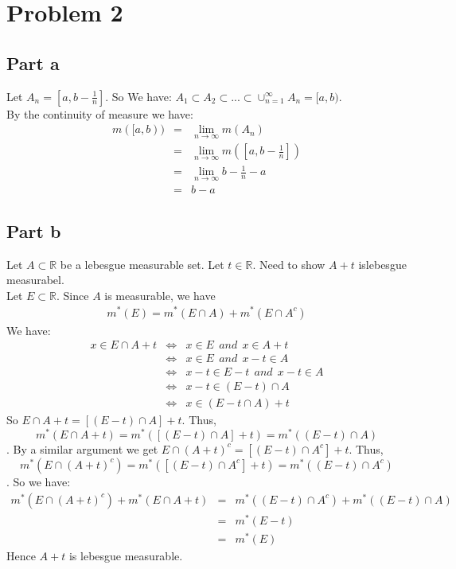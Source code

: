 \documentclass[12pt]{article}
\begin{document}
\clearpage
\section*{Problem 2}
\subsection*{Part a}
Let $A_n=[a,b-\frac{1}{n}]$. So We have:
$A_1 \subset A_2 \subset ... \subset \cup_{n=1}^{\infty}
A_n=[a,b)$. \\
By the continuity of measure we have:
\begin{eqnarray*}
m([a,b)) &=& \lim_{n \rightarrow \infty} m(A_n)
\\ &=&
\lim_{n \rightarrow \infty} m([a,b-\frac{1}{n}])
\\ &=&
\lim_{n \rightarrow \infty} b-\frac{1}{n}-a
\\ &=&
b-a
\end{eqnarray*}
\subsection*{Part b}
Let $A \subset \mathbb{R}$ be a lebesgue measurable set.
Let $t \in \mathbb{R}$. Need to show $A+t$ islebesgue measurabel. \\
Let $E \subset \mathbb{R}$. Since $A$ is measurable, we have
\begin{eqnarray}
m^*(E)=m^*(E \cap A)+m^*(E \cap A^c)
\end{eqnarray}
We have:
\begin{eqnarray*}
x \in E \cap A+t &\Longleftrightarrow &
x \in E \ \ and \ \ x \in A+t
\\ &\Longleftrightarrow &
x \in E \ \ and \ \ x-t \in A
\\ &\Longleftrightarrow &
x-t \in E-t \ \ and \ \ x-t \in A
\\ &\Longleftrightarrow &
x-t \in (E-t) \cap A
\\ &\Longleftrightarrow &
x \in (E-t \cap A) + t
\end{eqnarray*}
So $E \cap A+t = [(E-t) \cap A]+t$. Thus,
$$m^*(E \cap A+t)=m^*([(E-t) \cap A]+t)=m^*((E-t) \cap A)$$.
By a similar argument we get
$E \cap (A+t)^c = [(E-t) \cap A^c]+t$. Thus, 
$$m^*(E \cap (A+t)^c)=m^*([(E-t) \cap A^c]+t)=m^*((E-t) \cap A^c)$$.
So we have:
\begin{eqnarray*}
m^*(E \cap (A+t)^c)+m^*(E \cap A+t) &=&
m^*((E-t) \cap A^c)+m^*((E-t) \cap A) \\ &=&
m^*(E-t) \\ &=&
m^*(E)
\end{eqnarray*}
Hence $A+t$ is lebesgue measurable.
\end{document}
